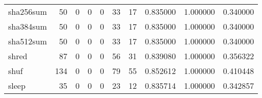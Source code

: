 \begin{tabular}{lrrrrrrrrr}
sha256sum &                                        50 &                                                  0 &                                                  0 &                                                  0 &                                                 33 &                                                 17 &                                           0.835000 &                               1.000000 &                             0.340000 \\
sha384sum &                                        50 &                                                  0 &                                                  0 &                                                  0 &                                                 33 &                                                 17 &                                           0.835000 &                               1.000000 &                             0.340000 \\
sha512sum &                                        50 &                                                  0 &                                                  0 &                                                  0 &                                                 33 &                                                 17 &                                           0.835000 &                               1.000000 &                             0.340000 \\
shred     &                                        87 &                                                  0 &                                                  0 &                                                  0 &                                                 56 &                                                 31 &                                           0.839080 &                               1.000000 &                             0.356322 \\
shuf      &                                       134 &                                                  0 &                                                  0 &                                                  0 &                                                 79 &                                                 55 &                                           0.852612 &                               1.000000 &                             0.410448 \\
sleep     &                                        35 &                                                  0 &                                                  0 &                                                  0 &                                                 23 &                                                 12 &                                           0.835714 &                               1.000000 &                             0.342857 \\

\end{tabular}
